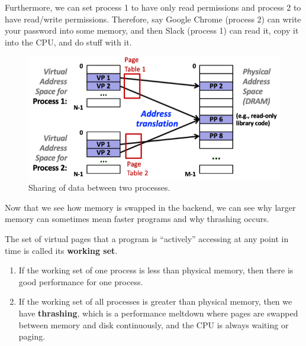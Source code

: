 \documentclass{article}
\begin{document}
    \begin{example}
      Furthermore, we can set process 1 to have only read permissions and process 2 to have read/write permissions. Therefore, say Google Chrome (process 2) can write your password into some memory, and then Slack (process 1) can read it, copy it into the CPU, and do stuff with it. 
      \begin{figure}[H]
        \centering 
        \includegraphics[scale=0.4]{img/vm_sharing.png}
        \caption{Sharing of data between two processes.} 
        \label{fig:vm_sharing}
      \end{figure}
    \end{example}

    Now that we see how memory is swapped in the backend, we can see why larger memory can sometimes mean faster programs and why thrashing occurs. 

    \begin{definition}[Thrashing]
      The set of virtual pages that a program is ``actively'' accessing at any point in time is called its \textbf{working set}. 
      \begin{enumerate}
        \item If the working set of one process is less than physical memory, then there is good performance for one process. 
        \item If the working set of all processes is greater than physical memory, then we have \textbf{thrashing}, which is a performance meltdown where pages are swapped between memory and disk continuously, and the CPU is always waiting or paging. 
      \end{enumerate}
    \end{definition}
\end{document}

